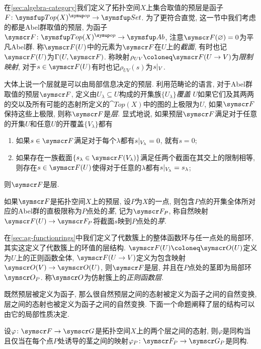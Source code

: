 在\ref{sec:algebra-category}我们定义了拓扑空间$X$上集合取值的预层是函子$F\colon \cat{Top}(X)^{\op}\to\cat{Set}$. 为了更符合直觉, 这一节中我们考虑的都是Abel群取值的预层, 为函子$\sheaf{F}\colon \cat{Top}(X)^{\op}\to\cat{Ab}$, 注意$\sheaf{F}(\varnothing)=0$为平凡Abel群. 称$\sheaf{F}(U)$中的元素为$\sheaf{F}$在$U$上的\emph{截面}, 有时也记$\sheaf{F}(U)$为$\Gamma (U, \sheaf{F})$. 称映射$\rho_{UV}\coloneq \sheaf{F}(U\to V)$为\emph{限制映射}, 对于$s\in \sheaf{F}(U)$有时也记$\rho_{UV}(s)$为$s\vert_{V}$.

大体上说一个层就是可以由局部信息决定的预层. 利用范畴论的语言, 对于Abel群取值的预层$\sheaf{F}$, 定义由$U_\lambda\subseteq U$构成的开集族$\{U_\lambda\}$\emph{覆盖} $U$如果它们及其两两的交以及所有可能的态射所定义的$\cat{Top}(X)$中的图的上极限为$U$, 如果$\sheaf{F}$保持这些上极限, 则称$\sheaf{F}$是\emph{层}. 显式地说, 如果预层$\sheaf{F}$满足对于任意的开集$U$和任意$U$的开覆盖$\{V_\lambda\}$都有
\begin{enumerate}
  \item 如果$s\in\sheaf{F}$满足对于每个$\lambda$都有$s\vert_{V_{\lambda}}=0$, 就有$s=0$;
  \item 如果存在一族截面$\{s_\lambda\in\sheaf{F(V_\lambda)}\}$满足任两个截面在其交上的限制相等, 则存在$s\in\sheaf{F(U)}$使得对于任意的$\lambda$都有$s\vert_{V_\lambda}=s_{\lambda}$;
\end{enumerate}
则$\sheaf{F}$是层.

如果$\sheaf{F}$是拓扑空间$X$上的预层, 设$P$为$X$的一点, 则包含$P$点的开集全体所对应的Abel群的直极限称为$P$点处的\emph{茎}, 记为$\sheaf{F}_P$, 称自然映射$\sheaf{F}(U)\to \sheaf{F}_P$将截面$s$映到$P$点处的\emph{芽}.

\begin{example}
  在\ref{sec:ag-functionrings}中我们定义了代数簇上的整体函数环与任一点处的局部环, 其实这定义了代数簇上的环值的层结构. $\sheaf{F}(U)\coloneq\OO (U)$定义为$U$上的正则函数全体, $\sheaf{F}(U\to V)$定义为包含映射$\OO (V)\to \OO(U)$, 则$\sheaf{F}$是层, 并且在$P$点处的茎即为局部环$\OO_P$. 称$\OO$为仿射簇上的\emph{正则函数层}.
\end{example}

既然预层被定义为函子, 那么很自然预层之间的态射被定义为函子之间的自然变换, 层之间的态射也被定义为函子之间的自然变换. 下面一个命题阐释了层的结构可以由它的局部性质决定.

\begin{proposition}
  设$\varphi\colon \sheaf{F}\to\sheaf{G}$是拓扑空间$X$上的两个层之间的态射, 则$\varphi$是同构当且仅当在每个点$P$处诱导的茎之间的映射$\varphi_P\colon \sheaf{F}_P\to\sheaf{G}_P$是同构.
\end{proposition}

